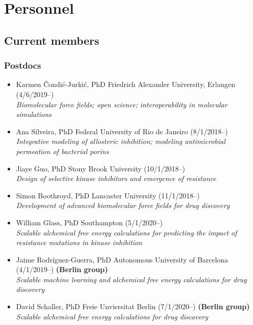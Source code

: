 \documentclass[10pt]{article}
\begin{document}
\eject


\section*{Personnel}

\subsection*{Current members}

\subsubsection*{Postdocs}

\begin{itemize}
  \item Karmen \v{C}ondi\'{c}-Jurki\'{c}, PhD Friedrich Alexander University, Erlangen (4/6/2019--)\\
  \emph{Biomolecular force fields; open science; interoperability in molecular simulations}

  \item Ana Silveira, PhD Federal University of Rio de Janeiro (8/1/2018--)\\
  \emph{Integrative modeling of allosteric inhibition; modeling antimicrobial permeation of bacterial porins}

  \item Jiaye Guo, PhD Stony Brook University (10/1/2018--)\\
  \emph{Design of selective kinase inhibitors and emergence of resistance}
  
  \item Simon Boothroyd, PhD Lancaster University (11/1/2018--)\\
  \emph{Development of advanced biomolecular force fields for drug discovery}

  \item William Glass, PhD Southampton (5/1/2020--) \\
  \emph{Scalable alchemical free energy calculations for predicting the impact of resistance mutations in kinase inhibition}

  \item Jaime Rodr\'{i}guez-Guerra, PhD Autonomous University of Barcelona (4/1/2019--) {\bf (Berlin group)}\\
  \emph{Scalable machine learning and alchemical free energy calculations for drug discovery}

  \item David Schaller, PhD Freie Unviersitat Berlin (7/1/2020--) {\bf (Berlin group)}\\
  \emph{Scalable alchemical free energy calculations for drug discovery}

\end{itemize}
\end{document}

